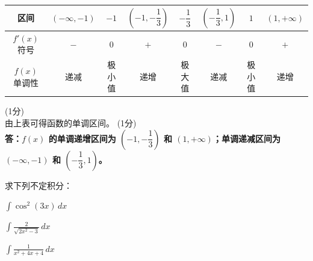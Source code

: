 \documentclass[12pt,a4paper]{exam-zh}
\newcommand{\qscore}[1]{%
    \unskip\nobreak\hfill
    \makebox[0pt][l]{\makebox[4em][r]{(#1\%)}}%
}
\begin{document}
\begin{solution}
\begin{enumerate}[label=(\alph*)]
        \begin{center}
        \begin{tabular}{c|c|c|c|c|c|c|c}
            \hline
            区间 & $(-\infty, -1)$ & $-1$ & $\left(-1, -\dfrac{1}{3}\right)$ & $-\dfrac{1}{3}$ & $\left(-\dfrac{1}{3}, 1\right)$ & $1$ & $(1, +\infty)$ \\
            \hline
            $f'(x)$ 符号 & $-$ & $0$ & $+$ & $0$ & $-$ & $0$ & $+$ \\
            \hline
            $f(x)$ 单调性 & 递减 & 极小值 & 递增 & 极大值 & 递减 & 极小值 & 递增 \\
            \hline
        \end{tabular}
        \end{center} \hfill (1分) \\
        由上表可得函数的单调区间。 \hfill (1分) \\
        \textbf{答：$f(x)$ 的单调递增区间为 $\left(-1, -\dfrac{1}{3}\right)$ 和 $(1, +\infty)$；单调递减区间为 $(-\infty, -1)$ 和 $\left(-\dfrac{1}{3}, 1\right)$。}
    \end{enumerate}
\end{solution}

\begin{question}[points = 9]
    求下列不定积分：

    \begin{questionparts}
        \item $\displaystyle \int \cos^2(3x) \, dx$ \qscore{3}

        \item $\displaystyle \int \frac{2}{\sqrt{2x^2 - 3}} \, dx$ \qscore{3}

        \item $\displaystyle \int \frac{1}{x^2 + 4x + 4} \, dx$ \qscore{3}
    \end{questionparts}
\end{question}
\end{document}
